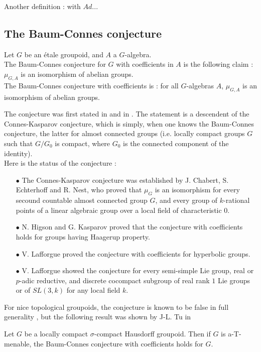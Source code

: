 Another definition : with $Ad$...

\subsection{The Baum-Connes conjecture}

\begin{conj}
Let $G$ be an étale groupoid, and $A$ a $G$-algebra.\\
The Baum-Connes conjecture for $G$ with coefficients in $A$ is the following claim : $\mu_{G,A}$ is an isomorphism of abelian groups.\\
The Baum-Connes conjecture with coefficients is : for all $G$-algebras $A$, $\mu_{G,A}$ is an isomorphism of abelian groups.
\end{conj}

The conjecture was first stated in \cite{BaumConnes} and in \cite{BaumConnesHigson}. The statement is a descendent of the Connes-Kasparov conjecture, which is simply, when one knows the Baum-Connes conjecture, the latter for almost connected groups (i.e. locally compact groups $G$ such that $G/G_0$ is compact, where $G_0$ is the connected component of the identity).\\

Here is the status of the conjecture :
\begin{itemize}
\item[$\bullet$] The Connes-Kasparov conjecture was established by J. Chabert, S. Echterhoff and R. Nest, who proved that $\mu_{G}$ is an isomorphism for every secound countable almost connected group $G$, and every group of $k$-rational points of a linear algebraic group over a local field of characteristic $0$.\\
\item[$\bullet$] N. Higson and G. Kasparov proved that the conjecture with coefficients holds for groups having Haagerup property. 
\item[$\bullet$] V. Lafforgue proved the conjecture with coefficients for hyperbolic groups.
\item[$\bullet$] V. Lafforgue showed the conjecture for every semi-simple Lie group, real or $p$-adic reductive, and discrete cocompact subgroup of real rank $1$ Lie groups or of $SL(3,k)$ for any local field $k$. \\
\end{itemize}

For nice topological groupoids, the conjecture is known to be false in full generality \cite{HigsonLaffSk}, but the following result was shown by J-L. Tu in \cite{TuThese}
\begin{thm}\label{Tu}
Let $G$ be a locally compact $\sigma$-compact Hausdorff groupoid. Then if $G$ is a-T-menable, the Baum-Connes conjecture with coefficients holds for $G$.
\end{thm}

